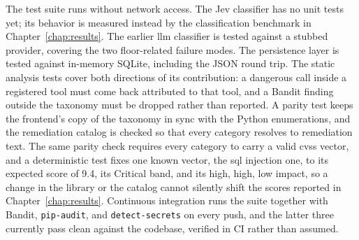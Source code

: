 The test suite runs without network access. The Jev classifier has no unit tests yet; its behavior is measured instead by the classification benchmark in Chapter~\ref{chap:results}. The earlier \gls{llm} classifier is tested against a stubbed provider, covering the two floor-related failure modes. The persistence layer is tested against in-memory SQLite, including the JSON round trip. The static analysis tests cover both directions of its contribution: a dangerous call inside a registered tool must come back attributed to that tool, and a Bandit finding outside the taxonomy must be dropped rather than reported. A parity test keeps the frontend's copy of the taxonomy in sync with the Python enumerations, and the remediation catalog is checked so that every category resolves to remediation text. 
The same parity check requires every category to carry a valid \gls{cvss} vector, and a deterministic test fixes one known vector, the \gls{sql} injection one, to its expected score of 9.4, its Critical band, and its high, high, low impact, so a change in the library or the catalog cannot silently shift the scores reported in Chapter~\ref{chap:results}.
Continuous integration runs the suite together with Bandit, \texttt{pip-audit}, and \texttt{detect-secrets} on every push, and the latter three currently pass clean against the codebase, verified in CI rather than assumed.

